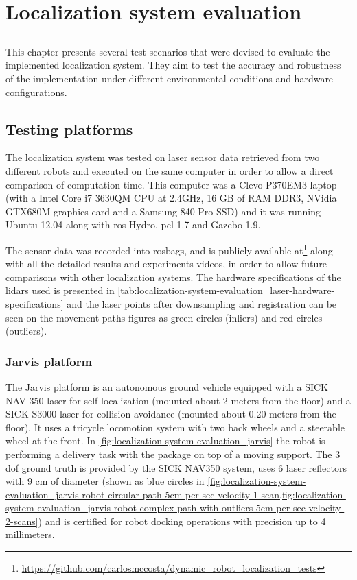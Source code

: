 \chapter{Localization system evaluation} \label{chap:localization-system-evaluation}



\section*{}

This chapter presents several test scenarios that were devised to evaluate the implemented localization system. They aim to test the accuracy and robustness of the implementation under different environmental conditions and hardware configurations.



\section{Testing platforms}

The localization system was tested on laser sensor data retrieved from two different robots and executed on the same computer in order to allow a direct comparison of computation time. This computer was a Clevo P370EM3 laptop (with a Intel Core i7 3630QM CPU at 2.4GHz, 16 GB of RAM DDR3, NVidia GTX680M graphics card and a Samsung 840 Pro SSD) and it was running Ubuntu 12.04 along with \gls{ros} Hydro, \gls{pcl} 1.7 and Gazebo 1.9.

The sensor data was recorded into rosbags, and is publicly available at\footnote{\url{https://github.com/carlosmccosta/dynamic_robot_localization_tests}} along with all the detailed results and experiments videos, in order to allow future comparisons with other localization systems. The hardware specifications of the \glspl{lidar} used is presented in \cref{tab:localization-system-evaluation_laser-hardware-specifications} and the laser points after downsampling and registration can be seen on the movement paths figures as green circles (inliers) and red circles (outliers).


\subsection{Jarvis platform}

The Jarvis platform is an autonomous ground vehicle equipped with a SICK NAV 350 laser for self-localization (mounted about 2 meters from the floor) and a SICK S3000 laser for collision avoidance (mounted about 0.20 meters from the floor). It uses a tricycle locomotion system with two back wheels and a steerable wheel at the front. In \cref{fig:localization-system-evaluation_jarvis} the robot is performing a delivery task with the package on top of a moving support. The 3 \gls{dof} ground truth is provided by the SICK NAV350 system, uses 6 laser reflectors with 9 cm of diameter (shown as blue circles in \cref{fig:localization-system-evaluation_jarvis-robot-circular-path-5cm-per-sec-velocity-1-scan,fig:localization-system-evaluation_jarvis-robot-complex-path-with-outliers-5cm-per-sec-velocity-2-scans}) and is certified for robot docking operations with precision up to 4 millimeters.

